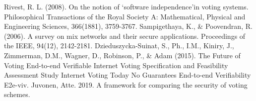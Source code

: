 \begin{thebibliography}{9}
 Rivest, R. L. (2008). On the notion of ‘software independence’in voting systems. Philosophical Transactions of the Royal Society A: Mathematical, Physical and Engineering Sciences, 366(1881), 3759-3767.
 Sampigethaya, K., \& Poovendran, R. (2006). A survey on mix networks and their secure applications. Proceedings of the IEEE, 94(12), 2142-2181.
 Dzieduszycka-Suinat, S., Ph., I.M., Kiniry, J., Zimmerman, D.M., Wagner, D., Robinson, P., \& Adam (2015). The Future of Voting End-to-end Verifiable Internet Voting Specification and Feasibility Assessment Study Internet Voting Today No Guarantees End-to-end Verifiability E2e-viv.
 Juvonen, Atte. 2019. A framework for comparing the security of voting schemes.
  
\end{thebibliography}
